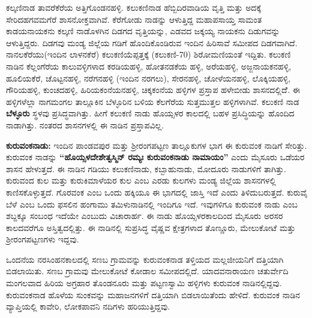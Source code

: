 ಕಲ್ಕಣಿನಾಡ ತಾವರೆಕೆರೆಯ ಅತ್ತಿಗೊಂಡನಹಳ್ಳಿ. ಕಲುಕಣಿನಾಡ ಹೆಬ್ಬಿದಿರವಾಡಿಯ ವೃತ್ತಿ ಮತ್ತು ಅದಕ್ಕೆ ಸೇರಿದ\break ಹಗವಮಗೆರೆ ಶಾಸನೋಕ್ತವಾಗಿವೆ. ಕೆರೆಗೋಡು ನಾಡನ್ನು ಆಳುತ್ತಿದ್ದ ಮಹಾಪಸಾಯ್ತ ಸಾಮಂತ ಕಾಡಯನಾಯಕನು ಕಲ್ಕಣಿ ನಾಡೊಳಗಿನ ದಿಡಗದ ವೃತ್ತಿಯನ್ನು, ಎಡವದ ಜಕ್ಕಯ್ಯ ನಾಯಕನು ದಿಡುಗವನ್ನು ಆಳುತ್ತಿದ್ದರು. ದಿಡಗವು ಮಂಡ್ಯ ಜಿಲ್ಲೆಯ ಗಡಿಗೆ ಹೊಂದಿಕೊಂಡಿರುವ ಇಂದಿನ ಹಿರಿಸಾವೆ ಸಮೀಪದ ದಿಡಗವಾಗಿದೆ. ನಾನಲಕೆರೆಯು(ಇಂದಿನ ಲಾಳನಕೆರೆ) ಕಲುಕಣಿಯೆಪ್ಪತ್ತಕ್ಕೆ (ಕಲುಕಣಿ-70) ಶಿರೋಮಣಿಯಂತೆ ಇದ್ದಿತು. ಕಲುಕಣಿ ನಾಡಿನ ಕೆಲ್ಲಂಗೆರೆಯ ಕಾಲುವಳ್ಳಿಗಳಾದ ಕರಡಿಯಹಳ್ಳಿ, ಹೋತನಡಕೆಯ ಹಳ್ಳಿ, ಅರೆಯಹಳ್ಳಿ, ಅಜ್ಜನಾಯಕನಹಳ್ಳಿ, ಹೂಲಿಯಕೆರೆ, ಚೊಟ್ಟನಹಳ್ಳಿ, ನರೆಗನಹಳ್ಳಿ (ಇಂದಿನ ನರಗಲು), ಸೇರನಹಳ್ಳಿ, ಚೋಳೆಯನಹಳ್ಳಿ, ಲೊಕ್ಕಿಯಹಳ್ಳಿ, ಗೌರಿಯಹಳ್ಳಿ, ಕುಂಚದಹಳ್ಳಿ, ಹಿರಿಯಕಂನೆಯನಹಳ್ಳಿ, ಚಿಕ್ಕಕಂನೆಯ ಹಳ್ಳಿಗಳ ಪ್ರಸ್ತಾಪ ಹಳೇಬೀಡು ಶಾಸನದಲ್ಲಿದೆೆ. ಈ ಹಳ್ಳಿಗಳೆಲ್ಲಾ ನಾಗಮಂಗಲ ತಾಲ್ಲೂಕಿನ ಬೆಳ್ಳೂರಿನ ಬಳಿಯ ಕೆಲಗೆರೆಯ ಸುತ್ತಮುತ್ತಲ ಹಳ್ಳಿಗಳಾಗಿವೆ. ಕಲುಕಣಿ ನಾಡ \textbf{ಬೆಳ್ಳೂರು} ಸ್ಥಳವು ಪ್ರಸಿದ್ಧವಾಗಿತ್ತು. ಹೀಗೆ ಕಲುಕಣಿ ನಾಡು ಹೊಯ್ಸಳರ ಕಾಲದಲ್ಲಿ ಬಹಳ ಪ್ರಸಿದ್ಧಿಯನ್ನು ಹೊಂದಿದ ನಾಡಾಗಿತ್ತು. ನಂತರದ ಶಾಸನಗಳಲ್ಲಿ ಈ ನಾಡಿನ ಪ್ರಸ್ತಾಪವಿಲ್ಲ.

\textbf{ಕುರುವಂಕನಾಡು:} ಇಂದಿನ ಪಾಂಡವಪುರ ಮತ್ತು ಶ‍್ರೀರಂಗಪಟ್ಟಣ ತಾಲ್ಲೂಕುಗಳ ಭಾಗ ಈ ಕುರುವಂಕ ನಾಡಿಗೆ ಸೇರಿತ್ತು. ಕುರುವಂಕ ನಾಡನ್ನು \textbf{“ಹೊಯ್ಸಳದೇಶೇತ್ವಸ್ಮಿನ್​ ರಮ್ಯಃ ಕುರುವಂಕನಾಡು ನಾಮಾಯಂ”} ಎಂದು ಮೈಸೂರು ಒಡೆಯರ ಶಾಸನ ಹೇಳುತ್ತದೆ. ಈ ನಾಡಿನ ಗಡಿಯು ಕಲುಕಣಿನಾಡು, ಕಬ್ಬಾಹುನಾಡು, ಮೋದೂರು ನಾಡುಗಳಿಗೆ ತಾಗಿತ್ತು. ಕುರುವಂದ ಕುಲ ಮತ್ತು ಕುರುಕಿಮಾಳೆಯರ ಕುಲ ಎಂಬ ಎರಡು ಕುಲಗಳು ಮಂಡ್ಯ ಜಿಲ್ಲೆಯ ಶಾಸನಗಳಲ್ಲಿ ಕಾಣಿಸಕೊಳ್ಳುತ್ತದೆ. ಗೊರವಂಕ ಎಂಬ ಒಂದು ಹಕ್ಕಿಯೂ ಈ ಭಾಗದಲ್ಲಿ ಜಾಸ್ತಿ ಇದೆ ಎಂದು ತಿಳಿದುಬರುತ್ತದೆ. ಕುರುವೈ ಬೆಳೆ ಎಂಬ ಒಂದು ಫಸಲಿನ ಹಂಗಾಮು ತಮಿಳುನಾಡಿನಲ್ಲಿ ಇಂದಿಗೂ ಇದೆ. ಇವುಗಳಿಗೂ ಕುರುವಂಕ ನಾಡು ಎಂಬ ಶಬ್ದಕ್ಕೂ ಸಂಬಂಧ ಇದೆಯೇ ಎಂಬುದು ವಿಚಾರಾರ್ಹ. ಈ ನಾಡು ಹೊಯ್ಸಳರಕಾಲದಿಂದ ಮೈಸೂರು ಅರಸರ ಕಾಲದವರೆಗೂ ಅಸ್ತಿತ್ವದಲ್ಲಿತ್ತು. ಈ ನಾಡಿನಲ್ಲಿ ಸುಪ್ರಸಿದ್ಧ ವೈಷ್ಣವ ಕ್ಷೇತ್ರಗಳಾದ ತೊಣ್ಣೂರು, ಮೇಲುಕೋಟೆ ಮತ್ತು ಶ‍್ರೀರಂಗಪಟ್ಟಣಗಳು ಇದ್ದವು.

ಒಂದನೆಯ ನರಸಿಂಹನಕಾಲದಲ್ಲಿ ಸಣಬ ಗ್ರಾಮವನ್ನು ಕುರುವಂಕನಾಡ ತಳ್ತಿಯದ ಮಲ್ಲಜೀಯನಿಗೆ ದತ್ತಿಯಾಗಿ ಬಿಡಲಾಯಿತು. ಸಣಬ ಗ್ರಾಮವು ಮೇಲುಕೋಟೆ ಕೋಡಾಲ ಸಮೀಪದಲ್ಲಿದೆ. ಯಾದವನಾರಾಯಣ ಚತುರ್ವೇದಿ ಮಂಗಲವಾದ ಹಿರಿಯ ಅಗ್ರಹಾರ ತೊಂಡನೂರು ಮತ್ತು ಪಟ್ಟಣಸ್ವಾಮಿ ಹಳ್ಳಿಗಳು ಕುರುವಂಕ ನಾಡಿನಲ್ಲಿದ್ದವು. ಕುರುವಂಕ\-ನಾಡ ಹೊಳೆಯ ಸುಂಕವನ್ನು ಮಹಾಜನಗಳಿಗೆ ದತ್ತಿಯಾಗಿ ಬಿಡಲಾಯಿತೆಂದು ಹೇಳಿದೆ. ಕುರುವಂಕ ನಾಡಿನ ವ್ಯಾಪ್ತಿಯಲ್ಲಿ ಕಾವೇರಿ, ಲೋಕಪಾವನಿ ನದಿಗಳು ಹರಿಯುತ್ತಿದ್ದವು.

